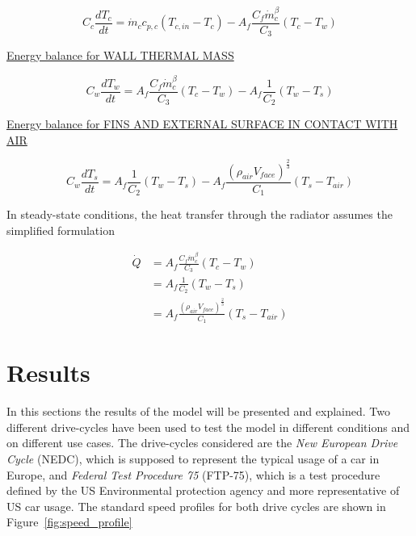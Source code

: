 \begin{equation}
  C_c \frac{dT_c}{dt} = \dot{m}_cc_{p,c}(T_{c,in}-T_c)-A_f \frac{C_f\dot{m}_c^\beta}{C_3}(T_c-T_w)
\end{equation}

\uline{Energy balance for WALL THERMAL MASS}

\begin{equation}
  C_w  \frac{dT_w}{dt} = A_f \frac{C_f\dot{m}_c^\beta}{C_3}(T_c-T_w) - A_f \frac{1}{C_2}(T_w-T_s)
\end{equation}

\uline{Energy balance for FINS AND EXTERNAL SURFACE IN CONTACT WITH AIR}

\begin{equation}
  C_w  \frac{dT_s}{dt} = A_f \frac{1}{C_2}(T_w-T_s) - A_f \frac{(\rho_{air}V_{face})^\frac{2}{3}}{C_1}(T_s-T_{air})
\end{equation}

In steady-state conditions, the heat transfer through the radiator assumes the simplified formulation

\begin{equation}
  \begin{split}
    \dot{Q} &= A_f \frac{C_f\dot{m}_c^\beta}{C_3}(T_c-T_w) \\ &= A_f \frac{1}{C_2}(T_w-T_s) \\ &= A_f \frac{(\rho_{air}V_{face})^{\frac{2}{3}}}{C_1}(T_s-T_{air})
  \end{split}
\end{equation}


\section{Results}

In this sections the results of the model will be presented and explained. Two different drive-cycles have been used to test the model in different conditions and on different use cases. The drive-cycles considered are the \emph{New European Drive Cycle} (NEDC), which is supposed to represent the typical usage of a car in Europe, and \emph{Federal Test Procedure 75} (FTP-75), which is a test procedure defined by the US Environmental protection agency and more representative of US car usage. The standard speed profiles for both drive cycles are shown in Figure~\ref{fig:speed_profile}

